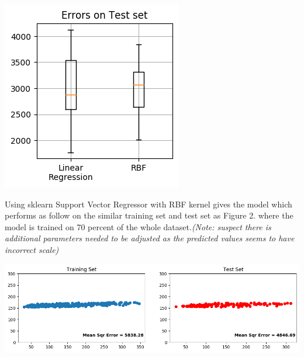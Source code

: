\documentclass{article}
\begin{document}
\begin{center}
\begin{tabular}{cccc}
\end{tabular}
\end{center}

\begin{center}
\includegraphics[scale=0.4]{error_compare}
\end{center}

Using sklearn Support Vector Regressor with RBF kernel gives the model which performs as follow on the similar training set and test set as Figure 2. where the model is trained on 70 percent of the whole dataset.\textit{(Note: suspect there is additional parameters needed to be adjusted as the predicted values seems to have incorrect scale)}

\begin{center}
\includegraphics[scale=0.4]{sklearn_compare}
\end{center}
\end{document}
